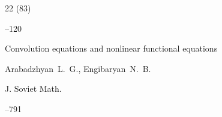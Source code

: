 \begin{thebibliography}{22}
(83)

--120






\paper Convolution equations and nonlinear functional equations

\by Arabadzhyan~L.~G., Engibaryan~N.~B.



\jour J. Soviet Math.




--791




\end{thebibliography}



\EngDate





\newpage

\Russian



%

%

